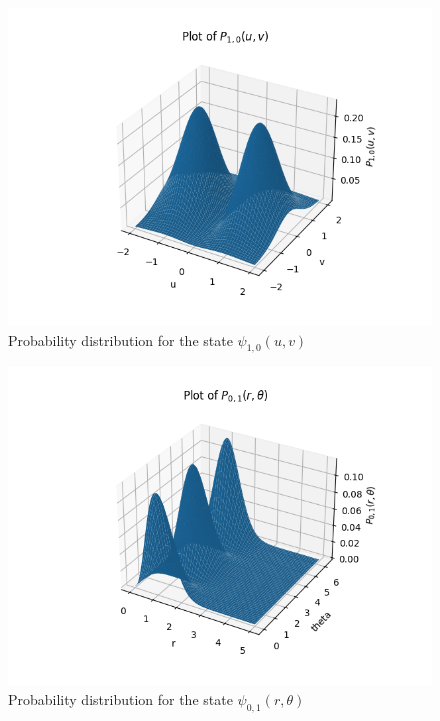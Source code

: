 \begin{figure}
  \centering
  \includegraphics{images8/P_1,0.png}
  \caption{Probability distribution for the state $\psi_{1,0}(u,v)$}
\end{figure}

\begin{figure}
  \centering
  \includegraphics{images8/P_0,1(r).png}
  \caption{Probability distribution for the state $\psi_{0,1}(r,\theta)$}
\end{figure}

